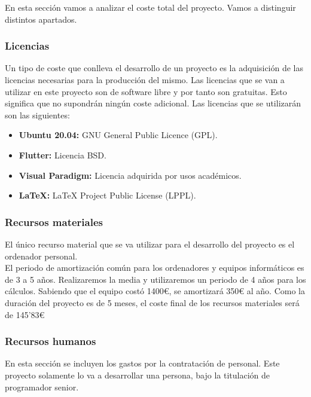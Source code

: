 En esta sección vamos a analizar el coste total del proyecto. Vamos a distinguir distintos apartados. 

\begin{adjustwidth}{2em}{0pt} %
	\subsubsection{Licencias}
	
	Un tipo de coste que conlleva el desarrollo de un proyecto es la adquisición de las licencias necesarias para la producción del mismo. Las licencias que se van a utilizar en este proyecto son de software libre y por tanto son gratuitas. Esto significa que no supondrán ningún coste adicional. Las licencias que se utilizarán son las siguientes: 

\newpage

	\begin{itemize}
		\item \textbf{Ubuntu 20.04:} GNU General Public Licence (GPL).
		\item \textbf{Flutter:} Licencia BSD. 
		\item \textbf{Visual Paradigm:} Licencia adquirida por usos académicos. 
		\item \textbf{LaTeX:} LaTeX Project Public License (LPPL).
	\end{itemize}
	
	
	\subsubsection{Recursos materiales}
	
	El único recurso material que se va utilizar para el desarrollo del proyecto es el ordenador personal. \\
	
	El periodo de amortización común para los ordenadores y equipos informáticos es de 3 a 5 años. Realizaremos la media y utilizaremos un periodo de 4 años para los cálculos. Sabiendo que el equipo costó 1400€, se amortizará 350€ al año. Como la duración del proyecto es de 5 meses, el coste final de los recursos materiales será de 145'83€
	
	\subsubsection{Recursos humanos}
	
	En esta sección se incluyen los gastos por la contratación de personal. Este proyecto solamente lo va a desarrollar una persona, bajo la titulación de programador senior. \\
	

\end{adjustwidth}
